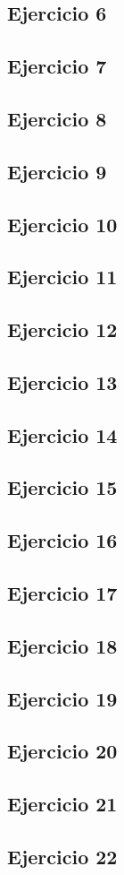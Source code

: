 \documentclass[10pt,a4paper]{article}
\begin{document}
  \subsection{Ejercicio 6}
  \subsection{Ejercicio 7}
  \subsection{Ejercicio 8}
  \subsection{Ejercicio 9}
  \subsection{Ejercicio 10}
  \subsection{Ejercicio 11}
  \subsection{Ejercicio 12}
  \subsection{Ejercicio 13}
  \subsection{Ejercicio 14}
  \subsection{Ejercicio 15}
  \subsection{Ejercicio 16}
  \subsection{Ejercicio 17}
  \subsection{Ejercicio 18}
  \subsection{Ejercicio 19}
  \subsection{Ejercicio 20}
  \subsection{Ejercicio 21}
  \subsection{Ejercicio 22}
\end{document}
